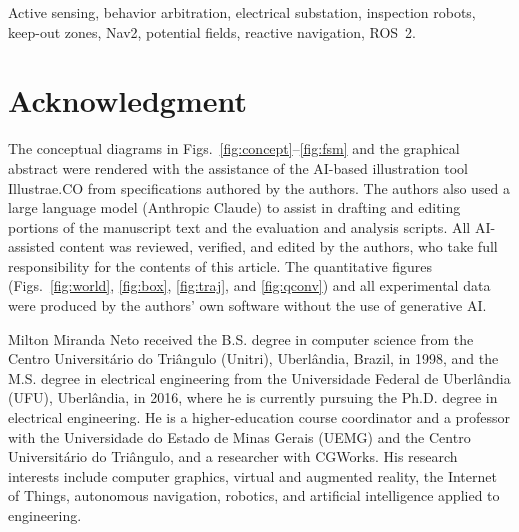 \documentclass{ieeeaccess}
\begin{document}
\begin{keywords}
Active sensing, behavior arbitration, electrical substation, inspection robots,
keep-out zones, Nav2, potential fields, reactive navigation, ROS~2.
\end{keywords}

\titlepgskip=-21pt
\maketitle








\appendices


\section*{Acknowledgment}
The conceptual diagrams in Figs.~\ref{fig:concept}--\ref{fig:fsm} and the
graphical abstract were rendered with the assistance of the AI-based
illustration tool Illustrae.CO from specifications authored by the authors. The authors also used a large language
model (Anthropic Claude) to assist in drafting and editing portions of the
manuscript text and the evaluation and analysis scripts. All AI-assisted content
was reviewed, verified, and edited by the authors, who take full responsibility
for the contents of this article. The quantitative figures
(Figs.~\ref{fig:world}, \ref{fig:box}, \ref{fig:traj}, and \ref{fig:qconv}) and
all experimental data were produced by the authors' own software without the use
of generative AI.




\begin{IEEEbiographynophoto}{Milton Miranda Neto}
received the B.S. degree in computer science from the Centro Universit\'ario do
Tri\^angulo (Unitri), Uberl\^andia, Brazil, in 1998, and the M.S. degree in
electrical engineering from the Universidade Federal de Uberl\^andia (UFU),
Uberl\^andia, in 2016, where he is currently pursuing the Ph.D. degree in
electrical engineering. He is a higher-education course coordinator and a
professor with the Universidade do Estado de Minas Gerais (UEMG) and the Centro
Universit\'ario do Tri\^angulo, and a researcher with CGWorks. His research
interests include computer graphics, virtual and augmented reality, the Internet
of Things, autonomous navigation, robotics, and artificial intelligence applied
to engineering.
\end{IEEEbiographynophoto}
\end{document}
